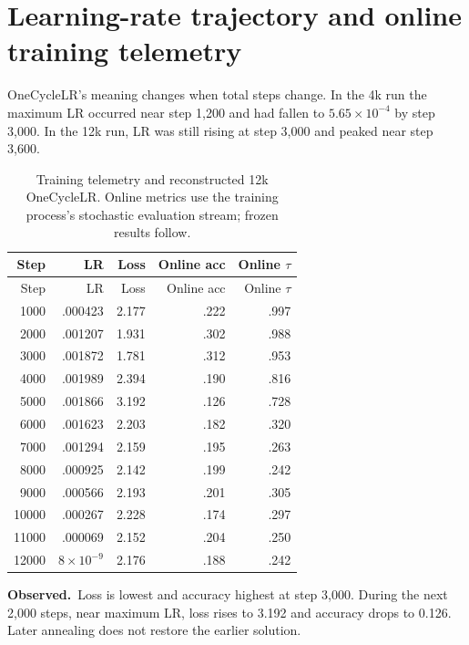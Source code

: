 \documentclass[10pt]{article}
\newcommand{\obs}{\textbf{Observed.}\ }
\begin{document}
\section{Learning-rate trajectory and online training telemetry}
OneCycleLR's meaning changes when total steps change. In the 4k run the maximum
LR occurred near step 1,200 and had fallen to $5.65\times10^{-4}$ by step 3,000.
In the 12k run, LR was still rising at step 3,000 and peaked near step 3,600.

\begin{longtable}{rrrrr}
\caption{Training telemetry and reconstructed 12k OneCycleLR. Online metrics
use the training process's stochastic evaluation stream; frozen results follow.}\\
\toprule Step & LR & Loss & Online acc & Online $\tau$ \\\midrule\endfirsthead
\toprule Step & LR & Loss & Online acc & Online $\tau$ \\\midrule\endhead
1000&.000423&2.177&.222&.997\\
2000&.001207&1.931&.302&.988\\
3000&.001872&1.781&.312&.953\\
4000&.001989&2.394&.190&.816\\
5000&.001866&3.192&.126&.728\\
6000&.001623&2.203&.182&.320\\
7000&.001294&2.159&.195&.263\\
8000&.000925&2.142&.199&.242\\
9000&.000566&2.193&.201&.305\\
10000&.000267&2.228&.174&.297\\
11000&.000069&2.152&.204&.250\\
12000&$8\!\times\!10^{-9}$&2.176&.188&.242\\
\bottomrule
\end{longtable}

\obs Loss is lowest and accuracy highest at step 3,000. During the next 2,000
steps, near maximum LR, loss rises to 3.192 and accuracy drops to 0.126. Later
annealing does not restore the earlier solution.

\newpage
\end{document}
